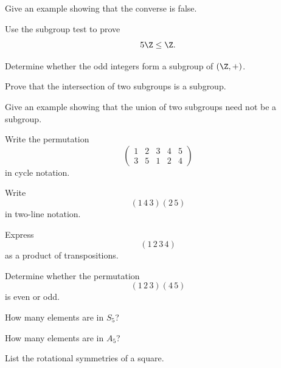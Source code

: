\begin{exercise}[2]
Give an example showing that the converse is false.
\end{exercise}

\begin{exercise}[2]
Use the subgroup test to prove
\[ 5\Z\leq\Z. \]
\end{exercise}

\begin{exercise}[2]
Determine whether the odd integers form a subgroup of \((\Z,+)\).
\end{exercise}

\begin{exercise}[2]
Prove that the intersection of two subgroups is a subgroup.
\end{exercise}

\begin{exercise}[2]
Give an example showing that the union of two subgroups need not be a
subgroup.
\end{exercise}

\begin{exercise}[1]
Write the permutation
\[
\begin{pmatrix}
1&2&3&4&5\\
3&5&1&2&4
\end{pmatrix}
\]
in cycle notation.
\end{exercise}

\begin{exercise}[2]
Write
\[ (1\,4\,3)(2\,5) \]
in two-line notation.
\end{exercise}

\begin{exercise}[2]
Express
\[ (1\,2\,3\,4) \]
as a product of transpositions.
\end{exercise}

\begin{exercise}[2]
Determine whether the permutation
\[ (1\,2\,3)(4\,5) \]
is even or odd.
\end{exercise}

\begin{exercise}[1]
How many elements are in \(S_5\)?
\end{exercise}

\begin{exercise}[1]
How many elements are in \(A_5\)?
\end{exercise}

\begin{exercise}[2]
List the rotational symmetries of a square.
\end{exercise}

